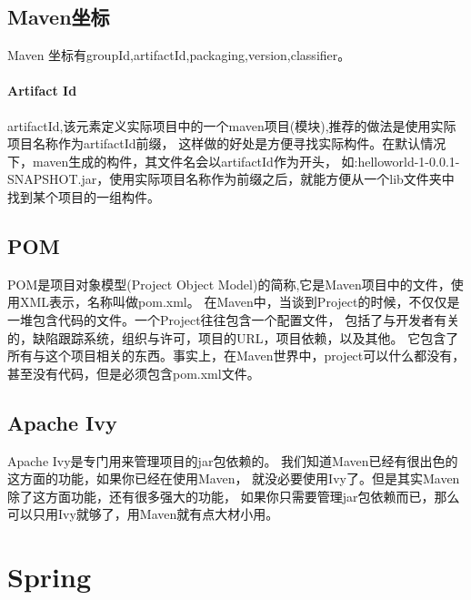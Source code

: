 \documentclass{book}
\begin{document}
\subsection{Maven坐标}

Maven 坐标有groupId,artifactId,packaging,version,classifier。

\paragraph{Artifact Id}
artifactId,该元素定义实际项目中的一个maven项目(模块),推荐的做法是使用实际项目名称作为artifactId前缀，
这样做的好处是方便寻找实际构件。在默认情况下，maven生成的构件，其文件名会以artifactId作为开头，
如:helloworld-1-0.0.1-SNAPSHOT.jar，使用实际项目名称作为前缀之后，就能方便从一个lib文件夹中找到某个项目的一组构件。


\subsection{POM}

POM是项目对象模型(Project Object Model)的简称,它是Maven项目中的文件，使用XML表示，名称叫做pom.xml。
在Maven中，当谈到Project的时候，不仅仅是一堆包含代码的文件。一个Project往往包含一个配置文件，
包括了与开发者有关的，缺陷跟踪系统，组织与许可，项目的URL，项目依赖，以及其他。
它包含了所有与这个项目相关的东西。事实上，在Maven世界中，project可以什么都没有，甚至没有代码，但是必须包含pom.xml文件。

\subsection{Apache Ivy}

Apache Ivy是专门用来管理项目的jar包依赖的。
我们知道Maven已经有很出色的这方面的功能，如果你已经在使用Maven，
就没必要使用Ivy了。但是其实Maven除了这方面功能，还有很多强大的功能，
如果你只需要管理jar包依赖而已，那么可以只用Ivy就够了，用Maven就有点大材小用。

\section{Spring}
\end{document}
